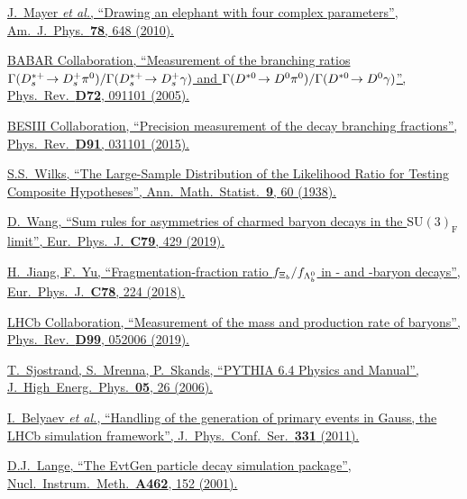 {\begin{thebibliography}{xxx}
	\href{https://doi.org/10.1119/1.3254017}{J.~Mayer \textit{et al.}, \enquote{Drawing an elephant with four complex parameters}, Am.\ J.\ Phys.\ \textbf{78}, 648 (2010).}

	\href{https://doi.org/10.1103/PhysRevD.72.091101}{BABAR Collaboration, \enquote{Measurement of the branching ratios $\Gamma({{D}^{*+}_{s}}\!\rightarrow {\ensuremath{{D}^+_{s}}}{\ensuremath{{\pi}^0}}) / \Gamma({{D}^{*+}_{s}}\!\rightarrow {\ensuremath{{D}^+_{s}}}\gamma)$ and $\Gamma({{D}^{*0}}\!\rightarrow {\ensuremath{{D}^0}}{\ensuremath{{\pi}^0}}) / \Gamma({{D}^{*0}}\!\rightarrow {\ensuremath{{D}^0}}\gamma)$}, Phys.\ Rev.\ \textbf{D72}, 091101 (2005).}

	\href{https://doi.org/10.1103/PhysRevD.91.031101}{BESIII Collaboration, \enquote{Precision measurement of the \Dstarz decay branching fractions}, Phys.\ Rev.\ \textbf{D91}, 031101 (2015).}

	\href{https://doi.org/10.1214/aoms/1177732360}{S.S.~Wilks, \enquote{The Large-Sample Distribution of the Likelihood Ratio for Testing Composite Hypotheses}, Ann.\ Math.\ Statist.\ \textbf{9}, 60 (1938).}

	\href{https://doi.org/10.1140/epjc/s10052-019-6925-y}{D.~Wang, \enquote{Sum rules for \CP asymmetries of charmed baryon decays in the $\mathrm{SU}(3)_\mathrm{F}$ limit}, Eur.\ Phys.\ J.\ \textbf{C79}, 429 (2019).}

	\href{https://doi.org/10.1140/epjc/s10052-018-5704-5}{H.~Jiang, F.~Yu, \enquote{Fragmentation-fraction ratio $f_{{{\Xi}_{b}}}/f_{{{\Lambda}^0_{b}}}$ in \bquark- and \cquark-baryon decays}, Eur.\ Phys.\ J.\ \textbf{C78}, 224 (2018).}

	\href{https://doi.org/10.1103/PhysRevD.99.052006}{LHCb Collaboration, \enquote{Measurement of the mass and production rate of \Xibm baryons}, Phys.\ Rev.\ \textbf{D99}, 052006 (2019).}

	\href{https://doi.org/10.1088/1126-6708/2006/05/026}{T.~Sjostrand, S.~Mrenna, P.~Skands, \enquote{PYTHIA 6.4 Physics and Manual}, J.\ High\ Energ.\ Phys.\ \textbf{05}, 26 (2006).}

	\href{https://doi.org/10.1088/1742-6596/331/3/032047}{I.~Belyaev \textit{et al.}, \enquote{Handling of the generation of primary events in Gauss, the LHCb simulation framework}, J.\ Phys.\ Conf.\ Ser.\ \textbf{331} (2011).}

	\href{https://doi.org/10.1016/S0168-9002(01)00089-4}{D.J.~Lange, \enquote{The EvtGen particle decay simulation package}, Nucl.\ Instrum.\ Meth.\ \textbf{A462}, 152 (2001).}


\end{thebibliography}}
